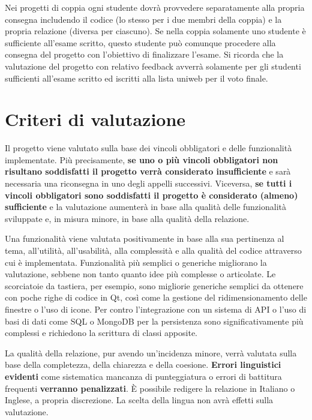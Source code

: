 \documentclass[10pt,a4paper,oneside]{article}
\begin{document}
Nei progetti di coppia ogni studente dovrà provvedere separatamente alla propria consegna includendo il codice (lo stesso per i due membri della coppia) e la propria relazione (diversa per ciascuno). Se nella coppia solamente uno studente è sufficiente all'esame scritto, questo studente può comunque procedere alla consegna del progetto con l'obiettivo di finalizzare l'esame. Si ricorda che la valutazione del progetto con relativo feedback avverrà solamente per gli studenti sufficienti all'esame scritto ed iscritti alla lista uniweb per il voto finale.


\section{Criteri di valutazione}
Il progetto viene valutato sulla base dei vincoli obbligatori e delle funzionalità implementate. Più precisamente, \textbf{se uno o più vincoli obbligatori non risultano soddisfatti il progetto verrà considerato insufficiente} e sarà necessaria una riconsegna in uno degli appelli successivi. Viceversa, \textbf{se tutti i vincoli obbligatori sono soddisfatti il progetto è considerato (almeno) sufficiente} e la valutazione aumenterà in base alla qualità delle funzionalità sviluppate e, in misura minore, in base alla qualità della relazione.

Una funzionalità viene valutata positivamente in base alla sua pertinenza al tema, all'utilità, all'usabilità, alla complessità e alla qualità del codice attraverso cui è implementata. Funzionalità più semplici o generiche migliorano la valutazione, sebbene non tanto quanto idee più complesse o articolate. Le scorciatoie da tastiera, per esempio, sono migliorie generiche semplici da ottenere con poche righe di codice in Qt, così come la gestione del ridimensionamento delle finestre o l'uso di icone. Per contro l'integrazione con un sistema di API o l'uso di basi di dati come SQL o MongoDB per la persistenza sono significativamente più complessi e richiedono la scrittura di classi apposite.

La qualità della relazione, pur avendo un'incidenza minore, verrà valutata sulla base della completezza, della chiarezza e della coesione. \textbf{Errori linguistici evidenti} come sistematica mancanza di punteggiatura o errori di battitura frequenti \textbf{verranno penalizzati}. È possibile redigere la relazione in Italiano o Inglese, a propria discrezione. La scelta della lingua non avrà effetti sulla valutazione.
\end{document}
